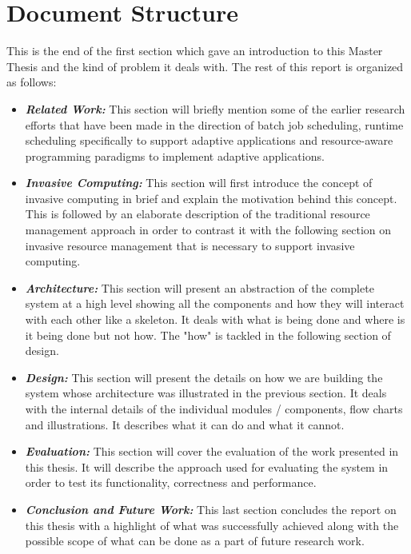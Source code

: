 \section{Document Structure}
This is the end of the first section which gave an introduction to this Master Thesis and the kind of problem it deals with. The rest of this report is organized as follows:
\begin{itemize}
\item \textbf{\textit{Related Work:}} This section will briefly mention some of the earlier research efforts that have been made in the direction of batch job scheduling, runtime scheduling specifically to support adaptive applications and resource-aware programming paradigms to implement adaptive applications. 
\item \textbf{\textit{Invasive Computing:}} This section will first introduce the concept of invasive computing in brief and explain the motivation behind this concept. This is followed by an elaborate description of the traditional resource management approach in order to contrast it with the following section on invasive resource management that is necessary to support invasive computing. 
\item \textbf{\textit{Architecture:}} This section will present an abstraction of the complete system at a high level showing all the components and how they will interact with each other like a skeleton. It deals with what is being done and where is it being done but not how. The "how" is tackled in the following section of design.
\item \textbf{\textit{Design:}} This section will present the details on how we are building the system whose architecture was illustrated in the previous section. It deals with the internal details of the individual modules / components, flow charts and illustrations. It describes what it can do and what it cannot.
\item \textbf{\textit{Evaluation:}} This section will cover the evaluation of the work presented in this thesis. It will describe the approach used for evaluating the system in order to test its functionality, correctness and performance.
\item \textbf{\textit{Conclusion and Future Work:}} This last section concludes the report on this thesis with a highlight of what was successfully achieved along with the possible scope of what can be done as a part of future research work.
\end{itemize}
